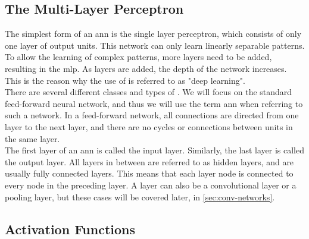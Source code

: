 \subsection{The Multi-Layer Perceptron}

\noindent The simplest form of an \acrshort{ann} is the single layer perceptron, which consists of only one layer of output units. This network can only learn linearly separable patterns. To allow the learning of complex patterns, more layers need to be added, resulting in the \acrfull{mlp}. As layers are added, the depth of the network increases. This is the reason why the use of  is referred to as "deep learning".\\

\noindent There are several different classes and types of . We will focus on the standard feed-forward neural network, and thus we will use the term \acrshort{ann} when referring to such a network. In a feed-forward network, all connections are directed from one layer to the next layer, and there are no cycles or connections between units in the same layer. \\

\noindent The first layer of an \acrshort{ann} is called the input layer. Similarly, the last layer is called the output layer. All layers in between are referred to as hidden layers, and are usually fully connected layers. This means that each layer node is connected to every node in the preceding layer. A layer can also be a convolutional layer or a pooling layer, but these cases will be covered later, in \autoref{sec:conv-networks}.

\subsection{Activation Functions}

